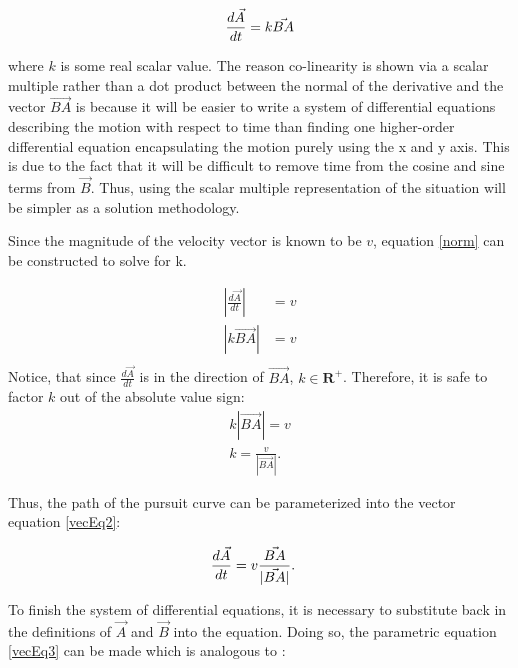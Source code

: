 \documentclass[pstricks, border=12pt]{article}
\begin{document}
\begin{equation}
    \centering
    \frac{d\Vec{A}}{dt} = k\Vec{BA}
    \label{vecEq1}
\end{equation}

where $k$ is some real scalar value. The reason co-linearity is shown via a scalar multiple rather than a dot product between the normal of the derivative and the vector $\Vec{BA}$ is because it will be easier to write a system of differential equations describing the motion with respect to time than finding one higher-order differential equation encapsulating the motion purely using the x and y axis. This is due to the fact that it will be difficult to remove time from the cosine and sine terms from $\vec B$. Thus, using the scalar multiple representation of the situation will be simpler as a solution methodology.

Since the magnitude of the velocity vector is known to be $v$, equation \eqref{norm} can be constructed to solve for k.

\begin{equation}
    \begin{split}
    \left|\frac{d\Vec{A}}{dt}\right| &= v\\
    \left|k\Vec{BA}\right| &= v\\
        \end{split}
        \label{norm}
\end{equation}
    Notice, that since $\frac{d\Vec{A}}{dt}$ is in the direction of $\Vec{BA}$, $k \in \mathbf{R}^+$. Therefore, it is safe to factor $k$ out of the absolute value sign:
\begin{equation}
    \begin{split}
    k\left|\Vec{BA}\right| = v\\
    k = \frac{v}{\left|\Vec{BA}\right|}.
    \end{split}
\end{equation}

Thus, the path of the pursuit curve can be parameterized into the vector equation \eqref{vecEq2}:

\begin{equation}
    \centering
    \begin{split}
    \frac{d\Vec{A}}{dt} &= v\frac{\Vec{BA}}{|\Vec{BA}|}.
    \end{split}
    \label{vecEq2}
\end{equation}

To finish the system of differential equations, it is necessary to substitute back in the definitions of $\vec A$ and $\vec B$ into the equation. Doing so, the parametric equation \eqref{vecEq3} can be made which is analogous to \cite{ferreol_2017}:
\end{document}
